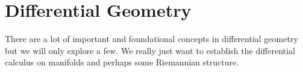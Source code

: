 \section{Differential Geometry}
There are a lot of important and foundational concepts in differential geometry
but we will only explore a few. We really just want to establish the differential
calculus on manifolds and perhaps some Riemannian structure.